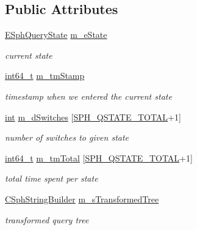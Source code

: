 \subsection*{Public Attributes}
\begin{DoxyCompactItemize}
\item 
\hyperlink{sphinxint_8h_a917e3d03a8db1617916e74f4d4078c06}{E\-Sph\-Query\-State} \hyperlink{classCSphQueryProfile_a51951e40aadac8284bf6bcc512de84a6}{m\-\_\-e\-State}
\begin{DoxyCompactList}\small\item\em current state \end{DoxyCompactList}\item 
\hyperlink{sphinxstd_8h_a996e72f71b11a5bb8b3b7b6936b1516d}{int64\-\_\-t} \hyperlink{classCSphQueryProfile_a59b27df0757e1d1a3087d83c14dfbee9}{m\-\_\-tm\-Stamp}
\begin{DoxyCompactList}\small\item\em timestamp when we entered the current state \end{DoxyCompactList}\item 
\hyperlink{sphinxexpr_8cpp_a4a26e8f9cb8b736e0c4cbf4d16de985e}{int} \hyperlink{classCSphQueryProfile_aa99e1f4ee788c704f11bb510199b72dc}{m\-\_\-d\-Switches} \mbox{[}\hyperlink{sphinxint_8h_a917e3d03a8db1617916e74f4d4078c06ae270d5641ecc03dcb7311b79bba3b473}{S\-P\-H\-\_\-\-Q\-S\-T\-A\-T\-E\-\_\-\-T\-O\-T\-A\-L}+1\mbox{]}
\begin{DoxyCompactList}\small\item\em number of switches to given state \end{DoxyCompactList}\item 
\hyperlink{sphinxstd_8h_a996e72f71b11a5bb8b3b7b6936b1516d}{int64\-\_\-t} \hyperlink{classCSphQueryProfile_a314603ebfbe41b032c282ff047394cdd}{m\-\_\-tm\-Total} \mbox{[}\hyperlink{sphinxint_8h_a917e3d03a8db1617916e74f4d4078c06ae270d5641ecc03dcb7311b79bba3b473}{S\-P\-H\-\_\-\-Q\-S\-T\-A\-T\-E\-\_\-\-T\-O\-T\-A\-L}+1\mbox{]}
\begin{DoxyCompactList}\small\item\em total time spent per state \end{DoxyCompactList}\item 
\hyperlink{sphinxstd_8h_af544895cdc9dcfd4532460c3b08cda1b}{C\-Sph\-String\-Builder} \hyperlink{classCSphQueryProfile_a1b07b39dc8543da115ddce681cba4315}{m\-\_\-s\-Transformed\-Tree}
\begin{DoxyCompactList}\small\item\em transformed query tree \end{DoxyCompactList}\end{DoxyCompactItemize}


